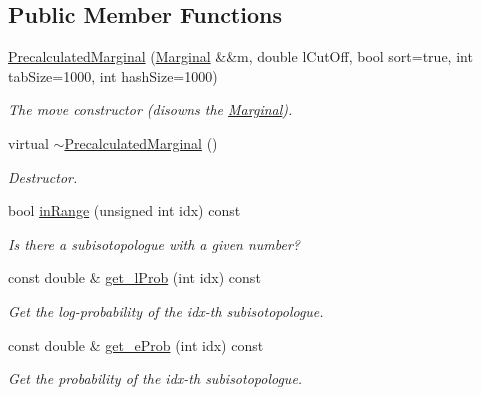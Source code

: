\subsection*{Public Member Functions}
\begin{DoxyCompactItemize}
\item 
\mbox{\hyperlink{class_iso_spec_1_1_precalculated_marginal_acb84bd7ba582847655c55bd64d64463e}{Precalculated\+Marginal}} (\mbox{\hyperlink{class_iso_spec_1_1_marginal}{Marginal}} \&\&m, double l\+Cut\+Off, bool sort=true, int tab\+Size=1000, int hash\+Size=1000)
\begin{DoxyCompactList}\small\item\em The move constructor (disowns the \mbox{\hyperlink{class_iso_spec_1_1_marginal}{Marginal}}). \end{DoxyCompactList}\item 
\mbox{\label{class_iso_spec_1_1_precalculated_marginal_a6b7b30cfe90ffba1d2c9d2f0d87107d8}} 
virtual \mbox{\hyperlink{class_iso_spec_1_1_precalculated_marginal_a6b7b30cfe90ffba1d2c9d2f0d87107d8}{$\sim$\+Precalculated\+Marginal}} ()
\begin{DoxyCompactList}\small\item\em Destructor. \end{DoxyCompactList}\item 
bool \mbox{\hyperlink{class_iso_spec_1_1_precalculated_marginal_a942b30ace039f80c50125360be4ed4d2}{in\+Range}} (unsigned int idx) const
\begin{DoxyCompactList}\small\item\em Is there a subisotopologue with a given number? \end{DoxyCompactList}\item 
const double \& \mbox{\hyperlink{class_iso_spec_1_1_precalculated_marginal_a07eee6d60635c9c1d6f92c181994e06a}{get\+\_\+l\+Prob}} (int idx) const
\begin{DoxyCompactList}\small\item\em Get the log-\/probability of the idx-\/th subisotopologue. \end{DoxyCompactList}\item 
const double \& \mbox{\hyperlink{class_iso_spec_1_1_precalculated_marginal_a7a38a567eadf16fa2ad41e81c8f55c02}{get\+\_\+e\+Prob}} (int idx) const
\begin{DoxyCompactList}\small\item\em Get the probability of the idx-\/th subisotopologue. \end{DoxyCompactList}\item 

\end{DoxyCompactItemize}

